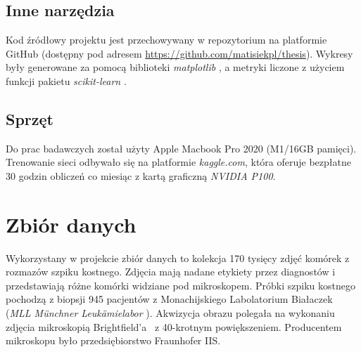 \subsection{Inne narzędzia}

Kod źródłowy projektu jest przechowywany w repozytorium na platformie GitHub (dostępny pod adresem \url{https://github.com/matisiekpl/thesis}).
Wykresy były generowane za pomocą biblioteki \textit{matplotlib} \cite{matplotlib},
a metryki liczone z użyciem funkcji pakietu \textit{scikit-learn} \cite{scikit_learn}.

\subsection{Sprzęt}

Do prac badawczych został użyty Apple Macbook Pro 2020 (M1/16GB pamięci).
Trenowanie sieci odbywało się na platformie \textit{kaggle.com}, która oferuje bezpłatne 30 godzin obliczeń co miesiąc z kartą graficzną \textit{NVIDIA P100}.


\section{Zbiór danych}

Wykorzystany w projekcie zbiór danych to kolekcja 170 tysięcy zdjęć komórek z rozmazów szpiku kostnego.
Zdjęcia mają nadane etykiety przez diagnostów i przedstawiają różne komórki widziane pod mikroskopem.
Próbki szpiku kostnego pochodzą z biopsji 945 pacjentów z Monachijskiego Labolatorium Białaczek (\textit{MLL Münchner Leukämielabor} \cite{mll}).
Akwizycja obrazu polegała na wykonaniu zdjęcia mikroskopią Brightfield'a~\cite{microscopy} z 40-krotnym powiększeniem.
Producentem mikroskopu było przedsiębiorstwo Fraunhofer IIS.

